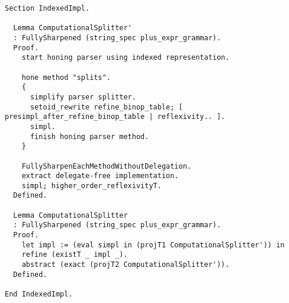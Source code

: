  

\begin{verbatim}
Section IndexedImpl.

  Lemma ComputationalSplitter'
  : FullySharpened (string_spec plus_expr_grammar).
  Proof.
    start honing parser using indexed representation.

    hone method "splits".
    {
      simplify parser splitter.
      setoid_rewrite refine_binop_table; [ presimpl_after_refine_binop_table | reflexivity.. ].
      simpl.
      finish honing parser method.
    }

    FullySharpenEachMethodWithoutDelegation.
    extract delegate-free implementation.
    simpl; higher_order_reflexivityT.
  Defined.

  Lemma ComputationalSplitter
  : FullySharpened (string_spec plus_expr_grammar).
  Proof.
    let impl := (eval simpl in (projT1 ComputationalSplitter')) in
    refine (existT _ impl _).
    abstract (exact (projT2 ComputationalSplitter')).
  Defined.

End IndexedImpl.

\end{verbatim}

